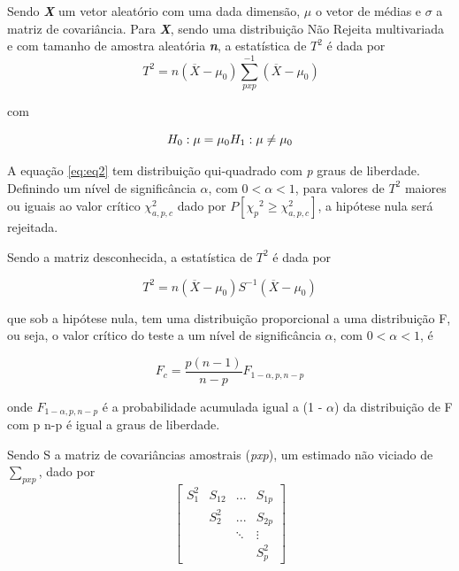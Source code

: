 Sendo \textbf{\textit{X}} um vetor aleatório com uma dada dimensão, \textbf{\textit{$\mu$}} o vetor de médias e \textbf{\textit{$\sigma$}} a matriz de covariância. Para \textbf{\textit{X}}, sendo uma distribuição Não Rejeita multivariada e com tamanho de amostra aleatória \textbf{\textit{n}}, a estatística de $T^2$ é dada por
\begin{equation}
\ T^2 = n(\overline{X} - \mu_0) \sum_{pxp}^{-1} {(\overline{X} - \mu_0)}
\label{eq:eq2}
\end{equation}

com

\begin{equation}
 H_0 : \mu = \mu_0 \\
 H_1 : \mu \neq \mu_0
\label{eq:eq3}
\end{equation}

A equação \ref{eq:eq2} tem distribuição qui-quadrado com \textit{p} graus de liberdade. Definindo um nível de significância $\alpha$, com $0 < \alpha < 1$, para valores de $T^2$  maiores ou iguais ao valor crítico ${\chi^2_{a,p,c}}$ dado por $P[{\chi_p}^2 \geq {\chi^2_{a,p,c}}]$,  a hipótese nula será rejeitada.   

Sendo a matriz desconhecida, a estatística de $T^2$ é dada por

\begin{equation}
T^2 = n(\overline{X} -\mu_0) S^{-1}(\overline{X} - \mu_0)
\label{eq:eq4}
\end{equation}

que sob a hipótese nula, tem uma distribuição proporcional a uma distribuição F, ou seja, o valor crítico do teste a um nível de significância $\alpha$, com $0 < \alpha < 1$, é

\begin{equation}
F_c = \frac{p(n-1)}{n-p} F_{1-\alpha, p, n - p}
\label{eq:eq5}
\end{equation}

onde $F_{1-\alpha, p, n - p}$ é a probabilidade acumulada igual a (1 - $\alpha$) da distribuição de F com p
n-p é igual a graus de liberdade.

Sendo S a matriz de covariâncias amostrais (\textit{pxp}), um estimado não viciado de $\sum_{pxp}$, dado por
\begin{equation}
\begin{bmatrix}
S^{2}_{1} & S_{12} & ... & S_{1p} \\ 
 & S^{2}_{2} & ... & S_{2p} \\ 
 &  & \ddots  & \vdots  \\ 
 &  &  & S^{2}_{p}
\end{bmatrix}
 \label{eq:eq6}
\end{equation}

